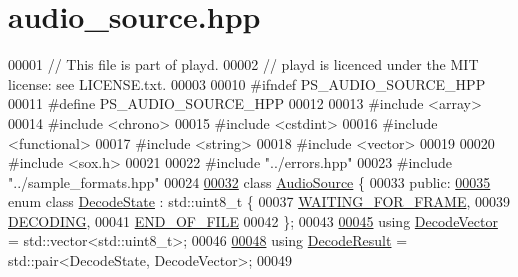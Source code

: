 \hypertarget{audio__source_8hpp_source}{\section{audio\+\_\+source.\+hpp}
\label{audio__source_8hpp_source}
}

\begin{DoxyCode}
00001 \textcolor{comment}{// This file is part of playd.}
00002 \textcolor{comment}{// playd is licenced under the MIT license: see LICENSE.txt.}
00003 
00010 \textcolor{preprocessor}{#ifndef PS\_AUDIO\_SOURCE\_HPP}
00011 \textcolor{preprocessor}{#define PS\_AUDIO\_SOURCE\_HPP}
00012 
00013 \textcolor{preprocessor}{#include <array>}
00014 \textcolor{preprocessor}{#include <chrono>}
00015 \textcolor{preprocessor}{#include <cstdint>}
00016 \textcolor{preprocessor}{#include <functional>}
00017 \textcolor{preprocessor}{#include <string>}
00018 \textcolor{preprocessor}{#include <vector>}
00019 
00020 \textcolor{preprocessor}{#include <sox.h>}
00021 
00022 \textcolor{preprocessor}{#include "../errors.hpp"}
00023 \textcolor{preprocessor}{#include "../sample\_formats.hpp"}
00024 
\hypertarget{audio__source_8hpp_source_l00032}{}\hyperlink{classAudioSource}{00032} \textcolor{keyword}{class }\hyperlink{classAudioSource}{AudioSource} \{
00033 \textcolor{keyword}{public}:
\hypertarget{audio__source_8hpp_source_l00035}{}\hyperlink{classAudioSource_a9a2f5de44325c84e69a7af1331aa159d}{00035}     \textcolor{keyword}{enum class} \hyperlink{classAudioSource_a9a2f5de44325c84e69a7af1331aa159d}{DecodeState} : std::uint8\_t \{
00037         \hyperlink{classAudioSource_a9a2f5de44325c84e69a7af1331aa159da22a62bc6e9b3fff5866c4259f046bad8}{WAITING\_FOR\_FRAME},
00039         \hyperlink{classAudioSource_a9a2f5de44325c84e69a7af1331aa159da9b75f3acd3c3480965b0f5ee466e7f25}{DECODING},
00041         \hyperlink{classAudioSource_a9a2f5de44325c84e69a7af1331aa159da581953f6b20ad7f993b64b1dc632032e}{END\_OF\_FILE}
00042     \};
00043 
\hypertarget{audio__source_8hpp_source_l00045}{}\hyperlink{classAudioSource_a836c61e348dbe7df6ba255669c015303}{00045}     \textcolor{keyword}{using} \hyperlink{classAudioSource_a836c61e348dbe7df6ba255669c015303}{DecodeVector} = std::vector<std::uint8\_t>;
00046 
\hypertarget{audio__source_8hpp_source_l00048}{}\hyperlink{classAudioSource_aadbadeba50d982d09cfe0d1e05160ef9}{00048}     \textcolor{keyword}{using} \hyperlink{classAudioSource_aadbadeba50d982d09cfe0d1e05160ef9}{DecodeResult} = std::pair<DecodeState, DecodeVector>;
00049 

\end{DoxyCode}
